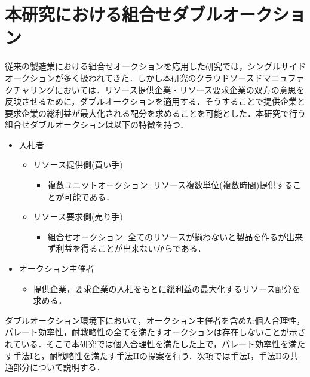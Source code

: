 \hypertarget{ux672cux7814ux7a76ux306bux304aux3051ux308bux7d44ux5408ux305bux30c0ux30d6ux30ebux30aaux30fcux30afux30b7ux30e7ux30f3}{%
\section{本研究における組合せダブルオークション}\label{ux672cux7814ux7a76ux306bux304aux3051ux308bux7d44ux5408ux305bux30c0ux30d6ux30ebux30aaux30fcux30afux30b7ux30e7ux30f3}}

従来の製造業における組合せオークションを応用した研究では，シングルサイドオークションが多く扱われてきた\cite{suginouchi}．しかし本研究のクラウドソースドマニュファクチャリングにおいては．リソース提供企業・リソース要求企業の双方の意思を反映させるために，ダブルオークションを適用する．そうすることで提供企業と要求企業の総利益が最大化される配分を求めることを可能とした．本研究で行う組合せダブルオークションは以下の特徴を持つ．

\begin{itemize}
\tightlist
\item
  入札者

  \begin{itemize}
  \tightlist
  \item
    リソース提供側(買い手)

    \begin{itemize}
    \tightlist
    \item
      複数ユニットオークション:
      リソース複数単位(複数時間)提供することが可能である．
    \end{itemize}
  \item
    リソース要求側(売り手)

    \begin{itemize}
    \tightlist
    \item
      組合せオークション:
      全てのリソースが揃わないと製品を作るが出来ず利益を得ることが出来ないからである．
    \end{itemize}
  \end{itemize}
\item
  オークション主催者

  \begin{itemize}
  \tightlist
  \item
    提供企業，要求企業の入札をもとに総利益の最大化するリソース配分を求める．
  \end{itemize}
\end{itemize}

ダブルオークション環境下において，オークション主催者を含めた個人合理性，パレート効率性，耐戦略性の全てを満たすオークションは存在しないことが示されている\cite{Ohseto2000}．そこで本研究では個人合理性を満たした上で，パレート効率性を満たす手法Iと，耐戦略性を満たす手法IIの提案を行う．次項では手法I，手法IIの共通部分について説明する．

